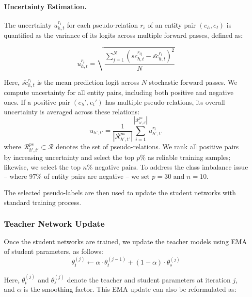 \paragraph{Uncertainty Estimation.} The uncertainty $u^{r_i}_{h,t}$ for each pseudo-relation $r_i$ of an entity pair $(e_h, e_t)$ is quantified as the variance of its logits across multiple forward passes, defined as:

\begin{equation}
\label{uncertainty-score}
u^{r_i}_{h,t} = \sqrt{\frac{\sum_{j=1}^N(sc_{h,t}^{r_{ij}} - \bar{sc}_{h,t}^{r_i})^2}{N}}
\end{equation}

Here, $\bar{sc}_{h,t}^{r_i}$ is the mean prediction logit across $N$ stochastic forward passes. We compute uncertainty for all entity pairs, including both positive and negative ones. If a positive pair $(e_h', e_t')$ has multiple pseudo-relations, its overall uncertainty is averaged across these relations:
\begin{equation}
u_{h',t'} = \frac{1}{|\mathcal{R}^{ps}_{h', t'}|} \sum_{i=1}^{|\mathcal{R}^{ps}_{h', t'}|} u^{r_i}_{h',t'}
\end{equation}
where $\mathcal{R}^{ps}_{h', t'} \subset \mathcal{R}$ denotes the set of pseudo-relations. We rank all positive pairs by increasing uncertainty and select the top $p\%$ as reliable training samples; likewise, we select the top $n\%$ negative pairs. To address the class imbalance issue -- where 97\% of entity pairs are negative -- we set $p = 30$ and $n = 10$.

The selected pseudo-labels are then used to update the student networks with standard training process.

\subsubsection{Teacher Network Update}
\label{sec:teacher-net-update}
Once the student networks are trained, we update the teacher models using EMA of student parameters, as follows:
\begin{equation}
    \label{eq:ema-teacher-update}
    \theta_{t}^{(j)} \leftarrow \alpha \cdot \theta_t^{(j-1)} + (1-\alpha) \cdot \theta_s^{(j)}
\end{equation}

Here, $\theta_{t}^{(j)}$ and $\theta_s^{(j)}$ denote the teacher and student parameters at iteration $j$, and $\alpha$ is the smoothing factor. This EMA update can also be reformulated as:

